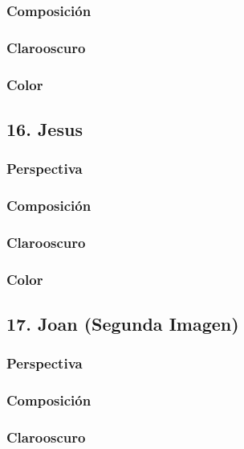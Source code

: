 \documentclass[12pt]{article}
\begin{document}
        \subsubsection{Composición}
    
        \subsubsection{Clarooscuro}
    
        \subsubsection{Color}
    \subsection{16. Jesus}
        \subsubsection{Perspectiva}
    
        \subsubsection{Composición}
    
        \subsubsection{Clarooscuro}
    
        \subsubsection{Color}
    \subsection{17. Joan (Segunda Imagen)}
        \subsubsection{Perspectiva}
    
        \subsubsection{Composición}
    
        \subsubsection{Clarooscuro}
    
\end{document}
